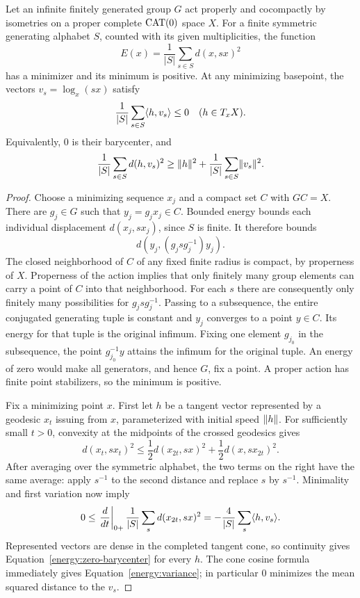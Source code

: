 \begin{lemma}\label{energy:minimizer}
Let an infinite finitely generated group $G$ act properly and
cocompactly by isometries on a proper complete $\operatorname{CAT}(0)$ space $X$.
For a finite symmetric generating alphabet $S$, counted with its given
multiplicities, the function
\[
 E(x)=\frac1{|S|}\sum_{s\in S}d(x,sx)^2
\]
has a minimizer and its minimum is positive.  At any minimizing
basepoint, the vectors $v_s=\log_x(sx)$ satisfy
\begin{equation}\label{energy:zero-barycenter}
 \frac1{|S|}\sum_{s\in S}\langle h,v_s\rangle\le0
 \quad(h\in T_xX).
\end{equation}
Equivalently, $0$ is their barycenter, and
\begin{equation}\label{energy:variance}
 \frac1{|S|}\sum_{s\in S}d(h,v_s)^2
 \ge \lVert h\rVert^2+\frac1{|S|}\sum_{s\in S}\lVert v_s\rVert^2.
\end{equation}
\end{lemma}

\begin{proof}
Choose a minimizing sequence $x_j$ and a compact set $C$ with $GC=X$.
There are $g_j\in G$ such that $y_j=g_jx_j\in C$.  Bounded energy bounds
each individual displacement $d(x_j,sx_j)$, since $S$ is finite.  It
therefore bounds
\[
 d(y_j,(g_jsg_j^{-1})y_j).
\]
The closed neighborhood of $C$ of any fixed finite radius is compact,
by properness of $X$.  Properness of the action implies that only
finitely many group elements can carry a point of $C$ into that
neighborhood.  For each $s$ there are consequently only finitely many
possibilities for $g_jsg_j^{-1}$.  Passing to a subsequence, the entire
conjugated generating tuple is constant and $y_j$ converges to a point
$y\in C$.  Its energy for that tuple is the original infimum.  Fixing
one element $g_{j_0}$ in the subsequence, the point $g_{j_0}^{-1}y$
attains the infimum for the original tuple.  An energy of zero would
make all generators, and hence $G$, fix a point.  A proper action has
finite point stabilizers, so the minimum is positive.

Fix a minimizing point $x$.  First let $h$ be a tangent vector
represented by a geodesic $x_t$ issuing from $x$, parameterized with
initial speed $\lVert h\rVert$.  For sufficiently small $t>0$, convexity at
the midpoints of the crossed geodesics gives
\[
 d(x_t,sx_t)^2\le
 \frac12d(x_{2t},sx)^2+\frac12d(x,sx_{2t})^2.
\]
After averaging over the symmetric alphabet, the two terms on the
right have the same average: apply $s^{-1}$ to the second distance and
replace $s$ by $s^{-1}$.  Minimality and first variation now imply
\[
 0\le
 \left.\frac{d}{dt}\right|_{0+}
 \frac1{|S|}\sum_s d(x_{2t},sx)^2
 =-\frac4{|S|}\sum_s\langle h,v_s\rangle.
\]
Represented vectors are dense in the completed tangent cone, so
continuity gives Equation~\eqref{energy:zero-barycenter} for every $h$.
The cone cosine formula immediately gives
Equation~\eqref{energy:variance}; in particular $0$ minimizes the mean
squared distance to the $v_s$.
\end{proof}

